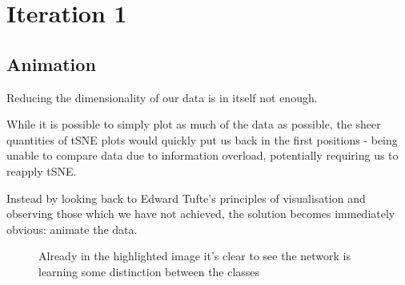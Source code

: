\documentclass[a4paper,11pt,titlepage]{article}
\begin{document}
\clearpage

\section{Iteration 1}
	\subsection{Animation}
	Reducing the dimensionality of our data is in itself not enough. 
	\par 
	While it is possible to simply plot as much of the data as possible, the sheer quantities of tSNE plots would quickly put us back in the first positions - being unable to compare data due to information overload, potentially requiring us to reapply tSNE. 
	\par 
	Instead by looking back to Edward Tufte's principles of visualisation and observing those which we have not achieved, the solution becomes immediately obvious: animate the data.
	\par 
	
	\begin{figure}[H]
    			\caption{Already in the highlighted image it's clear to see the network is learning some distinction between the classes}%
	\end{figure}	
	
\end{document}
